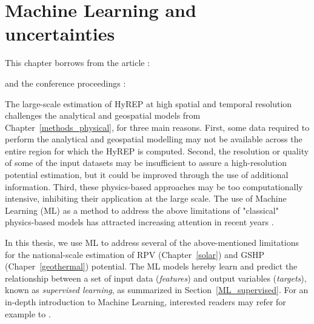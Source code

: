 \chapter{Machine Learning and \mbox{uncertainties}}
\label{methods_ML}

\vspace{-15pt} %
\begin{tcolorbox}[enhanced,width=\textwidth,size=fbox,
        sharp corners,colframe=black!5!white,drop fuzzy shadow southeast,
        boxrule=3mm, parbox=false] 
        
This chapter borrows from the article \citep{walch_big_2020}:

\qquad {}

and the conference proceedings \cite{walch_spatio-temporal_2019, walch_fast_2019}:

\quad {} 

\quad {}
\end{tcolorbox}

The large-scale estimation of HyREP at high spatial and temporal resolution challenges the analytical and geospatial models from Chapter~\ref{methods_physical}, for three main reasons.
First, some data required to perform the analytical and geospatial modelling may not be available across the entire region for which the HyREP is computed.
Second, the resolution or quality of some of the input datasets may be insufficient to assure a high-resolution potential estimation, but it could be improved through the use of additional information.
Third, these physics-based approaches may be too computationally intensive, inhibiting their application at the large scale.
The use of Machine Learning (ML) as a method to address the above limitations of "classical" physics-based models has attracted increasing attention in recent years \cite{willard_integrating_2020}. 

In this thesis, we use ML to address several of the above-mentioned limitations for the national-scale estimation of RPV (Chapter~\ref{solar}) and GSHP (Chaper~\ref{geothermal}) potential. 
The ML models hereby %
learn and predict the relationship between a set of input data (\textit{features}) and output variables (\textit{targets}), known as \textit{supervised learning}, 
as summarized in Section~\ref{ML_supervised}.
For an in-depth introduction to Machine Learning, interested readers may refer for example to \citet{bishop_pattern_2006}.

